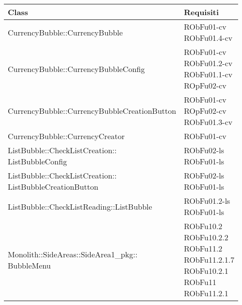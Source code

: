 \begin{center}
\begin{longtable}{|
*{1}{>{\centering\arraybackslash}m{7.5cm}|}
*{1}{>{\centering\arraybackslash}m{2.5cm}|}}
\hline \textbf{Class} & \textbf{Requisiti}\\
\hline \endhead
\hline \endfoot

CurrencyBubble::CurrencyBubble & \makecell{RObFu01-cv
\\RObFu01.4-cv
\\}\\\hline
CurrencyBubble::CurrencyBubbleConfig & \makecell{RObFu01-cv
\\RObFu01.2-cv
\\RObFu01.1-cv
\\ROpFu02-cv
\\}\\\hline
CurrencyBubble::CurrencyBubbleCreationButton & \makecell{RObFu01-cv
\\ROpFu02-cv
\\RObFu01.3-cv
\\}\\\hline
CurrencyBubble::CurrencyCreator & \makecell{RObFu01-cv
\\}\\\hline
\makecell[l]{ListBubble::CheckListCreation:: \\ \hfill ListBubbleConfig} & \makecell{RObFu02-ls
\\RObFu01-ls
\\}\\\hline
\makecell[l]{ListBubble::CheckListCreation:: \\ \hfill ListBubbleCreationButton} & \makecell{RObFu02-ls
\\RObFu01-ls
\\}\\\hline
ListBubble::CheckListReading::ListBubble & \makecell{RObFu01.2-ls
\\RObFu01-ls
\\}\\\hline
\makecell[l]{Monolith::SideAreas::SideArea1\_pkg:: \\ \hfill BubbleMenu} & \makecell{RObFu10.2
\\RObFu10.2.2
\\RObFu11.2
\\RObFu11.2.1.7
\\RObFu10.2.1
\\RObFu11
\\RObFu11.2.1
\\}\\\hline

\end{longtable}
\end{center}
